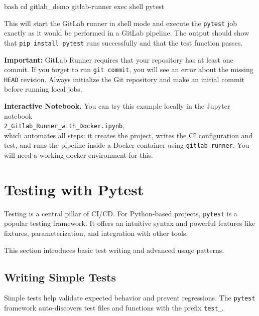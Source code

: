 \begin{codeonly}{bash}
cd gitlab_demo
gitlab-runner exec shell pytest
\end{codeonly}

This will start the GitLab runner in shell mode and execute the {\tt pytest} job exactly as it would be performed in a GitLab pipeline. The output should show that {\tt pip install pytest} runs successfully and that the test function passes.

{\bf Important:} GitLab Runner requires that your repository has at least one commit. If you forget to run {\tt git commit}, you will see an error about the missing {\tt HEAD} revision. Always initialize the Git repository and make an initial commit before running local jobs.

{\bf Interactive Notebook.} You can try this example locally in the Jupyter notebook\\
\texttt{2\_Gitlab\_Runner\_with\_Docker.ipynb}, \\
which automates all steps: it creates the project, writes the CI configuration and test, and runs the pipeline inside a Docker container using {\tt gitlab-runner}. You will need a working docker environment for this. 

%
\section{Testing with Pytest}
Testing is a central pillar of CI/CD. For Python-based projects, \texttt{pytest} is a popular testing framework. It offers an intuitive syntax and powerful features like fixtures, parameterization, and integration with other tools.

This section introduces basic test writing and advanced usage patterns.

%
\subsection{Writing Simple Tests}
Simple tests help validate expected behavior and prevent regressions. The \texttt{pytest} framework auto-discovers test files and functions with the prefix \texttt{test\_}.

